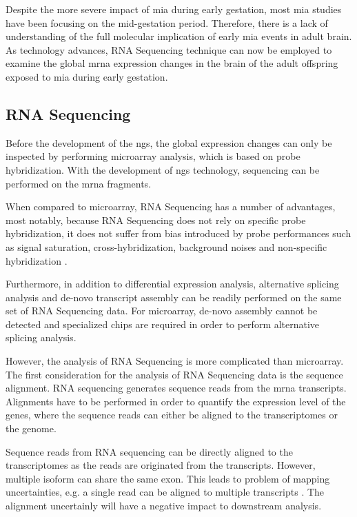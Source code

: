 	Despite the more severe impact of \gls{mia} during early gestation, most \gls{mia} studies have been focusing on the mid-gestation period.
	Therefore, there is a lack of understanding of the full molecular implication of early \gls{mia} events in adult brain.
	As technology advances, RNA Sequencing technique can now be employed to examine the global \gls{mrna} expression changes in the brain of the adult offspring exposed to \gls{mia} during early gestation.
	
	\subsection{RNA Sequencing}
	Before the development of the \gls{ngs}, the global expression changes can only be inspected by performing microarray analysis, which is based on probe hybridization.
	With the development of \gls{ngs} technology, sequencing can be performed on the \gls{mrna} fragments.
	
	When compared to microarray, RNA Sequencing has a number of advantages, most notably, because RNA Sequencing does not rely on specific probe hybridization, it does not suffer from bias introduced by probe performances such as signal saturation, cross-hybridization, background noises and non-specific hybridization \citep{Zhao2014}.
	
	Furthermore, in addition to differential expression analysis, alternative splicing analysis and de-novo transcript assembly can be readily performed on the same set of RNA Sequencing data.
	For microarray, de-novo assembly cannot be detected and specialized chips are required in order to perform alternative splicing analysis. 
	
	However, the analysis of RNA Sequencing is more complicated than microarray.
	The first consideration for the analysis of RNA Sequencing data is the sequence alignment.
	RNA sequencing generates sequence reads from the \gls{mrna} transcripts.
	Alignments have to be performed in order to quantify the expression level of the genes, where the sequence reads can either be aligned to the transcriptomes or the genome. 
		
	Sequence reads from RNA sequencing can be directly aligned to the transcriptomes as the reads are originated from the transcripts.
	However, multiple isoform can share the same exon. 
	This leads to problem of mapping uncertainties, e.g. a single read can be aligned to multiple transcripts \citep{Li2011e}.
	The alignment uncertainly will have a negative impact to downstream analysis. 
	
